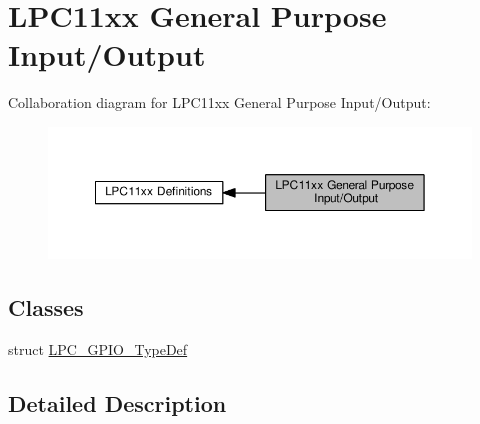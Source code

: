 \hypertarget{group___l_p_c11xx___g_p_i_o}{}\section{L\+P\+C11xx General Purpose Input/\+Output}
\label{group___l_p_c11xx___g_p_i_o}
Collaboration diagram for L\+P\+C11xx General Purpose Input/\+Output\+:\nopagebreak
\begin{figure}[H]
\begin{center}
\leavevmode
\includegraphics[width=350pt]{group___l_p_c11xx___g_p_i_o}
\end{center}
\end{figure}
\subsection*{Classes}
\begin{DoxyCompactItemize}
\item 
struct \hyperlink{struct_l_p_c___g_p_i_o___type_def}{L\+P\+C\+\_\+\+G\+P\+I\+O\+\_\+\+Type\+Def}
\end{DoxyCompactItemize}


\subsection{Detailed Description}
